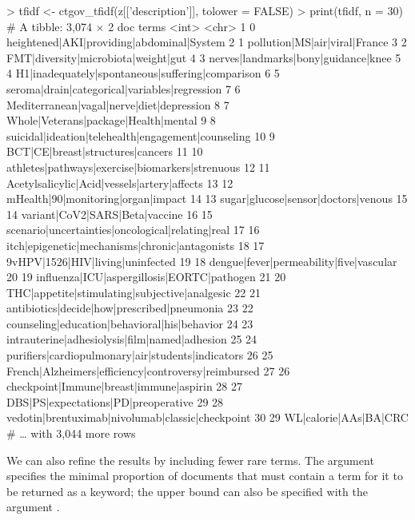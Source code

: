 \begin{example}
> tfidf <- ctgov_tfidf(z[['description']], tolower = FALSE)
> print(tfidf, n = 30)
# A tibble: 3,074 × 2
     doc terms
   <int> <chr>
 1     0 heightened|AKI|providing|abdominal|System
 2     1 pollution|MS|air|viral|France
 3     2 FMT|diversity|microbiota|weight|gut
 4     3 nerves|landmarks|bony|guidance|knee
 5     4 H1|inadequately|spontaneous|suffering|comparison
 6     5 seroma|drain|categorical|variables|regression
 7     6 Mediterranean|vagal|nerve|diet|depression
 8     7 Whole|Veterans|package|Health|mental
 9     8 suicidal|ideation|telehealth|engagement|counseling
10     9 BCT|CE|breast|structures|cancers
11    10 athletes|pathways|exercise|biomarkers|strenuous
12    11 Acetylsalicylic|Acid|vessels|artery|affects
13    12 mHealth|90|monitoring|organ|impact
14    13 sugar|glucose|sensor|doctors|venous
15    14 variant|CoV2|SARS|Beta|vaccine
16    15 scenario|uncertainties|oncological|relating|real
17    16 itch|epigenetic|mechanisms|chronic|antagonists
18    17 9vHPV|1526|HIV|living|uninfected
19    18 dengue|fever|permeability|five|vascular
20    19 influenza|ICU|aspergillosis|EORTC|pathogen
21    20 THC|appetite|stimulating|subjective|analgesic
22    21 antibiotics|decide|how|prescribed|pneumonia
23    22 counseling|education|behavioral|his|behavior
24    23 intrauterine|adhesiolysis|film|named|adhesion
25    24 purifiers|cardiopulmonary|air|students|indicators
26    25 French|Alzheimers|efficiency|controversy|reimbursed
27    26 checkpoint|Immune|breast|immune|aspirin
28    27 DBS|PS|expectations|PD|preoperative
29    28 vedotin|brentuximab|nivolumab|classic|checkpoint
30    29 WL|calorie|AAs|BA|CRC
# … with 3,044 more rows
\end{example}

We can also refine the results by including fewer rare terms. The argument
 specifies the minimal proportion of documents that must contain a term
for it to be returned as a keyword; the upper bound can also be specified
with the argument .

